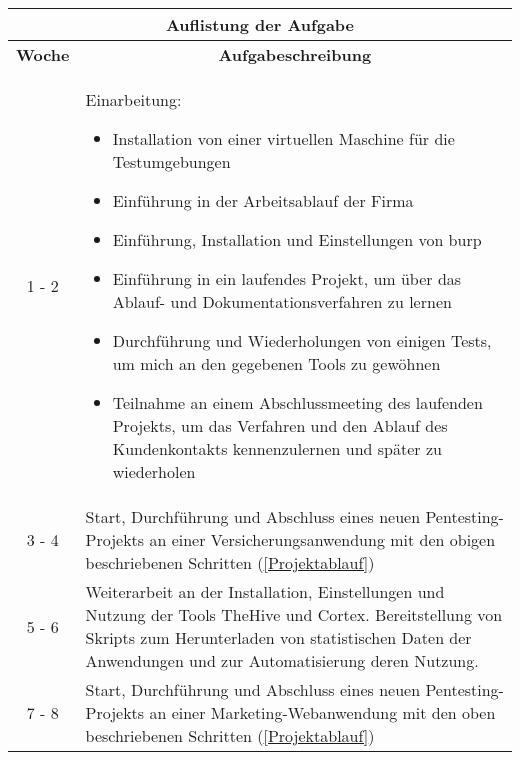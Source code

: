 \begin{table}[H]
    \begin{tabularx}{\textwidth}{|c|X|}
    \toprule
    \multicolumn{2}{c}{\textbf{Auflistung der Aufgabe}} \\
    \midrule
    \multicolumn{1}{c}{\textbf{Woche}} & \multicolumn{1}{c}{\textbf{Aufgabeschreibung}} \\
    \hline
    1 - 2    & Einarbeitung:
                \begin{itemize}
                    \item Installation von einer virtuellen Maschine für die Testumgebungen
                    \item Einführung in der Arbeitsablauf der Firma
                    \item Einführung, Installation und Einstellungen von \gls{burp}
                    \item Einführung in ein laufendes Projekt, um über das Ablauf- und Dokumentationsverfahren zu lernen
                    \item Durchführung und Wiederholungen von einigen Tests, um mich an den gegebenen Tools zu gewöhnen
                    \item Teilnahme an einem Abschlussmeeting des laufenden Projekts, um das Verfahren und den Ablauf des Kundenkontakts kennenzulernen und später zu wiederholen
                \end{itemize} \\
        \hline

    3 - 4       &  Start, Durchführung und Abschluss eines neuen Pentesting-Projekts an einer Versicherungsanwendung mit den obigen beschriebenen Schritten (\ref{Projektablauf})  \\ 
    
        \hline
    
    5 - 6       & Weiterarbeit an der Installation, Einstellungen und Nutzung der Tools \gls{TheHive} und \gls{Cortex}. Bereitstellung von Skripts zum Herunterladen von statistischen Daten der Anwendungen und zur Automatisierung deren Nutzung.  \\ 
    
        \hline
    
    7 - 8      &  Start, Durchführung und Abschluss eines neuen Pentesting-Projekts an einer Marketing-Webanwendung mit den oben beschriebenen Schritten (\ref{Projektablauf}) \\

        \hline


\end{tabularx}
\end{table}
